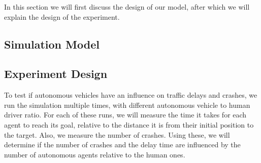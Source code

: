 In this section we will first discuss the design of our model, after which we will explain the design of the experiment.

\subsection{Simulation Model}
\label{sub:method:model}



\subsection{Experiment Design}
\label{sub:method:design}

To test if autonomous vehicles have an influence on traffic delays and crashes, we run the simulation multiple times, with different autonomous vehicle to human driver ratio. 
For each of these runs, we will measure the time it takes for each agent to reach its goal, relative to the distance it is from their initial position to the target. Also, we measure the number of crashes. 
Using these, we will determine if the number of crashes and the delay time are influenced by the number of autonomous agents relative to the human ones. 
